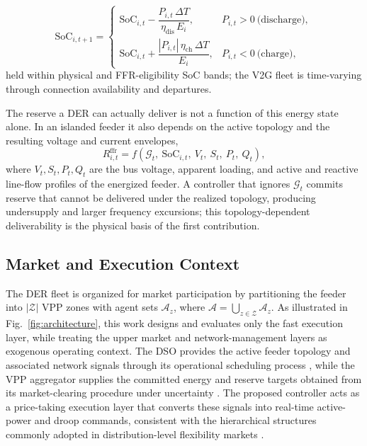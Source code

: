 \documentclass[lettersize,journal]{IEEEtran}
\begin{document}
	
	\begin{equation}
		\mathrm{SoC}_{i,t+1}=
		\begin{cases}
			\mathrm{SoC}_{i,t}-\dfrac{P_{i,t}\,\Delta T}{\eta_{\mathrm{dis}}\,E_i},
			& P_{i,t}>0\ \text{(discharge)},\\[6pt]
			\mathrm{SoC}_{i,t}+\dfrac{|P_{i,t}|\,\eta_{\mathrm{ch}}\,\Delta T}{E_i},
			& P_{i,t}<0\ \text{(charge)},
		\end{cases}
		\label{eq:bess_soc}
	\end{equation}
	held within physical and FFR-eligibility SoC bands; the V2G fleet is time-varying through connection availability and departures.
	
	The reserve a DER can actually deliver is not a function of this energy state alone. In an islanded feeder it also depends on the active topology and the resulting voltage and current envelopes,
	\begin{equation}
		R^{\mathrm{ffr}}_{i,t}
		= f\!\left(\mathcal{G}_t,\ \mathrm{SoC}_{i,t},\ V_t,\ S_t,\ P_t,\ Q_t\right),
		\label{eq:deliverability}
	\end{equation}
	where $V_t,S_t,P_t,Q_t$ are the bus voltage, apparent loading, and active and reactive line-flow profiles of the energized feeder. A controller that ignores $\mathcal{G}_t$ commits reserve that cannot be delivered under the realized topology, producing undersupply and larger frequency excursions; this topology-dependent deliverability is the physical basis of the first contribution.
	
	\subsection{Market and Execution Context}
	\label{sec:model:layers}
	
	The DER fleet is organized for market participation by partitioning the feeder into $|\mathcal{Z}|$ VPP zones with agent sets $\mathcal{A}_z$, where $\mathcal{A}=\bigcup_{z\in\mathcal{Z}}\mathcal{A}_z$.
	As illustrated in Fig.~\ref{fig:architecture}, this work designs and evaluates only the fast execution layer, while treating the upper market and network-management layers as exogenous operating context. The DSO provides the active feeder topology and associated network signals through its operational scheduling process 
	\cite{basdomenech2024dlmp}, while the VPP aggregator supplies the committed energy and reserve targets obtained from its market-clearing procedure under uncertainty
	\cite{liu2021wdrovpp,arrigo2021wdroreserve}. The proposed
	controller acts as a price-taking execution layer that converts these signals into real-time active-power and droop commands, consistent with the hierarchical structures commonly adopted in distribution-level flexibility markets
	\cite{huang2015dlmp}.
	
\end{document}
